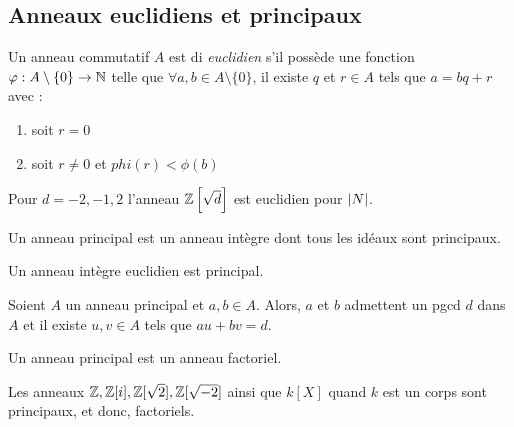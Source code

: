 \documentclass{cours}
\begin{document}
\subsection{Anneaux euclidiens et principaux}
\begin{definition}
    Un anneau commutatif $A$ est di \emph{euclidien} s'il possède une fonction $\varphi : A\setminus \{0\} \to \mathbb{N}$ telle que $\forall a, b \in A \setminus \{0\}$, il existe $q$ et $r \in A$ tels que $a = bq + r$ avec : 
    \begin{enumerate}
        \item soit $r = 0$
        \item soit $r \neq 0$ et $phi(r) < \phi(b)$
    \end{enumerate}
\end{definition}

\begin{proposition}
    Pour $d = -2, -1, 2$ l'anneau $\mathbb{Z}\left[\sqrt{d}\right]$ est euclidien pour $\left|N\right|$.
\end{proposition}

\begin{definition}
    Un anneau principal est un anneau intègre dont tous les idéaux sont principaux. 
\end{definition}

\begin{proposition}
    Un anneau intègre euclidien est principal.
\end{proposition}

\begin{proposition}
    Soient $A$ un anneau principal et $a, b \in A$. Alors, $a$ et $b$ admettent un pgcd $d$ dans $A$ et il existe $u, v \in A$ tels que $au + bv = d$. 
\end{proposition}

\begin{theorem}
    Un anneau principal est un anneau factoriel. 
\end{theorem}

\begin{corollary}
    Les anneaux $\mathbb{Z}, \mathbb{Z}[i], \mathbb{Z}[\sqrt{2}], \mathbb{Z}[\sqrt{-2}]$ ainsi que $k[X]$ quand $k$ est un corps sont principaux, et donc, factoriels. 
\end{corollary}
\end{document}
